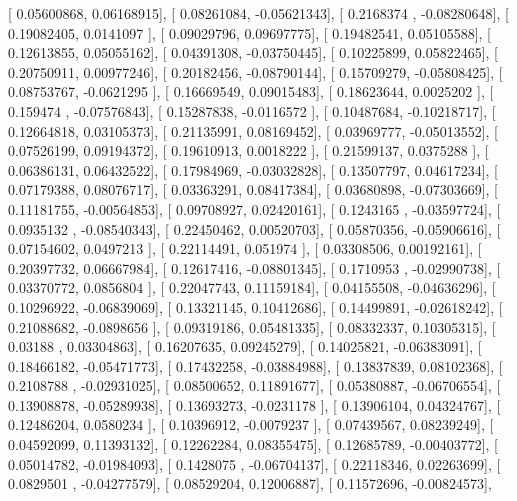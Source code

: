 \documentclass{article}
\begin{document}
       [ 0.05600868,  0.06168915],
       [ 0.08261084, -0.05621343],
       [ 0.2168374 , -0.08280648],
       [ 0.19082405,  0.0141097 ],
       [ 0.09029796,  0.09697775],
       [ 0.19482541,  0.05105588],
       [ 0.12613855,  0.05055162],
       [ 0.04391308, -0.03750445],
       [ 0.10225899,  0.05822465],
       [ 0.20750911,  0.00977246],
       [ 0.20182456, -0.08790144],
       [ 0.15709279, -0.05808425],
       [ 0.08753767, -0.0621295 ],
       [ 0.16669549,  0.09015483],
       [ 0.18623644,  0.0025202 ],
       [ 0.159474  , -0.07576843],
       [ 0.15287838, -0.0116572 ],
       [ 0.10487684, -0.10218717],
       [ 0.12664818,  0.03105373],
       [ 0.21135991,  0.08169452],
       [ 0.03969777, -0.05013552],
       [ 0.07526199,  0.09194372],
       [ 0.19610913,  0.0018222 ],
       [ 0.21599137,  0.0375288 ],
       [ 0.06386131,  0.06432522],
       [ 0.17984969, -0.03032828],
       [ 0.13507797,  0.04617234],
       [ 0.07179388,  0.08076717],
       [ 0.03363291,  0.08417384],
       [ 0.03680898, -0.07303669],
       [ 0.11181755, -0.00564853],
       [ 0.09708927,  0.02420161],
       [ 0.1243165 , -0.03597724],
       [ 0.0935132 , -0.08540343],
       [ 0.22450462,  0.00520703],
       [ 0.05870356, -0.05906616],
       [ 0.07154602,  0.0497213 ],
       [ 0.22114491,  0.051974  ],
       [ 0.03308506,  0.00192161],
       [ 0.20397732,  0.06667984],
       [ 0.12617416, -0.08801345],
       [ 0.1710953 , -0.02990738],
       [ 0.03370772,  0.0856804 ],
       [ 0.22047743,  0.11159184],
       [ 0.04155508, -0.04636296],
       [ 0.10296922, -0.06839069],
       [ 0.13321145,  0.10412686],
       [ 0.14499891, -0.02618242],
       [ 0.21088682, -0.0898656 ],
       [ 0.09319186,  0.05481335],
       [ 0.08332337,  0.10305315],
       [ 0.03188   ,  0.03304863],
       [ 0.16207635,  0.09245279],
       [ 0.14025821, -0.06383091],
       [ 0.18466182, -0.05471773],
       [ 0.17432258, -0.03884988],
       [ 0.13837839,  0.08102368],
       [ 0.2108788 , -0.02931025],
       [ 0.08500652,  0.11891677],
       [ 0.05380887, -0.06706554],
       [ 0.13908878, -0.05289938],
       [ 0.13693273, -0.0231178 ],
       [ 0.13906104,  0.04324767],
       [ 0.12486204,  0.0580234 ],
       [ 0.10396912, -0.0079237 ],
       [ 0.07439567,  0.08239249],
       [ 0.04592099,  0.11393132],
       [ 0.12262284,  0.08355475],
       [ 0.12685789, -0.00403772],
       [ 0.05014782, -0.01984093],
       [ 0.1428075 , -0.06704137],
       [ 0.22118346,  0.02263699],
       [ 0.0829501 , -0.04277579],
       [ 0.08529204,  0.12006887],
       [ 0.11572696, -0.00824573],
\end{document}
